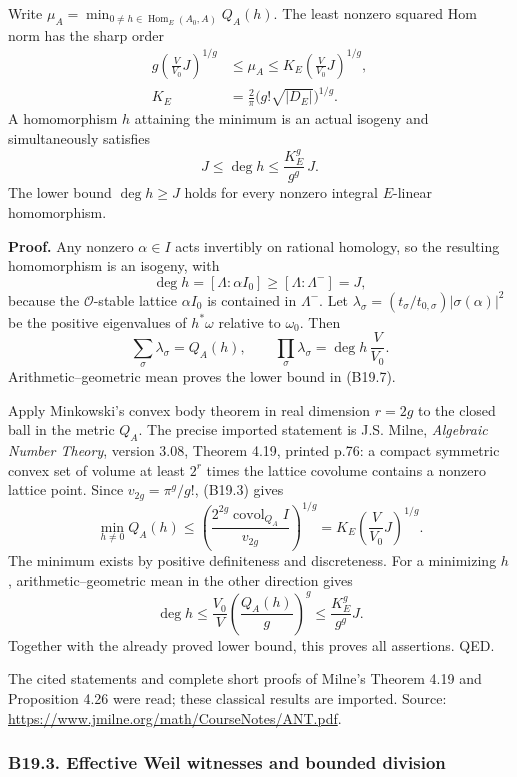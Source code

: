Write \(\mu_A=\min_{0\ne h\in\operatorname{Hom}_E(A_0,A)}Q_A(h)\). The least nonzero squared Hom norm has the sharp order \[
 \begin{aligned}
 g\left(\frac{V}{V_0}J\right)^{1/g}
 &\le\mu_A\le K_E\left(\frac{V}{V_0}J\right)^{1/g},\\
 K_E&=\frac2\pi\bigl(g!\sqrt{|D_E|}\bigr)^{1/g}.
 \end{aligned}
\tag{B19.7}
\] A homomorphism \(h\) attaining the minimum is an actual isogeny and simultaneously satisfies \[
 J\le\deg h\le \frac{K_E^g}{g^g}\,J.
\tag{B19.8}
\] The lower bound \(\deg h\ge J\) holds for every nonzero integral \(E\)-linear homomorphism.

\textbf{Proof.} Any nonzero \(\alpha\in I\) acts invertibly on rational homology, so the resulting homomorphism is an isogeny, with \[
 \deg h=[\Lambda:\alpha I_0]\ge[\Lambda:\Lambda^-]=J,
\] because the \(\mathcal O\)-stable lattice \(\alpha I_0\) is contained in \(\Lambda^-\). Let \(\lambda_\sigma=(t_\sigma/t_{0,\sigma})|\sigma(\alpha)|^2\) be the positive eigenvalues of \(h^*\omega\) relative to \(\omega_0\). Then \[
 \sum_\sigma\lambda_\sigma=Q_A(h),\qquad
 \prod_\sigma\lambda_\sigma=\deg h\,\frac{V}{V_0}.
\] Arithmetic--geometric mean proves the lower bound in (B19.7).

Apply Minkowski's convex body theorem in real dimension \(r=2g\) to the closed ball in the metric \(Q_A\). The precise imported statement is J.S. Milne, \emph{Algebraic Number Theory}, version 3.08, Theorem 4.19, printed p.76: a compact symmetric convex set of volume at least \(2^r\) times the lattice covolume contains a nonzero lattice point. Since \(v_{2g}=\pi^g/g!\), (B19.3) gives \[
 \min_{h\ne0}Q_A(h)
 \le\left(\frac{2^{2g}\operatorname{covol}_{Q_A} I}{v_{2g}}\right)^{1/g}
 =K_E\left(\frac{V}{V_0}J\right)^{1/g}.
\] The minimum exists by positive definiteness and discreteness. For a minimizing \(h\), arithmetic--geometric mean in the other direction gives \[
 \deg h\le\frac{V_0}{V}\left(\frac{Q_A(h)}g\right)^g
 \le \frac{K_E^g}{g^g}J.
\] Together with the already proved lower bound, this proves all assertions. QED.

The cited statements and complete short proofs of Milne's Theorem 4.19 and Proposition 4.26 were read; these classical results are imported. Source: \url{https://www.jmilne.org/math/CourseNotes/ANT.pdf}.

\subsubsection{B19.3. Effective Weil witnesses and bounded division}\label{b19.3.-effective-weil-witnesses-and-bounded-division}

